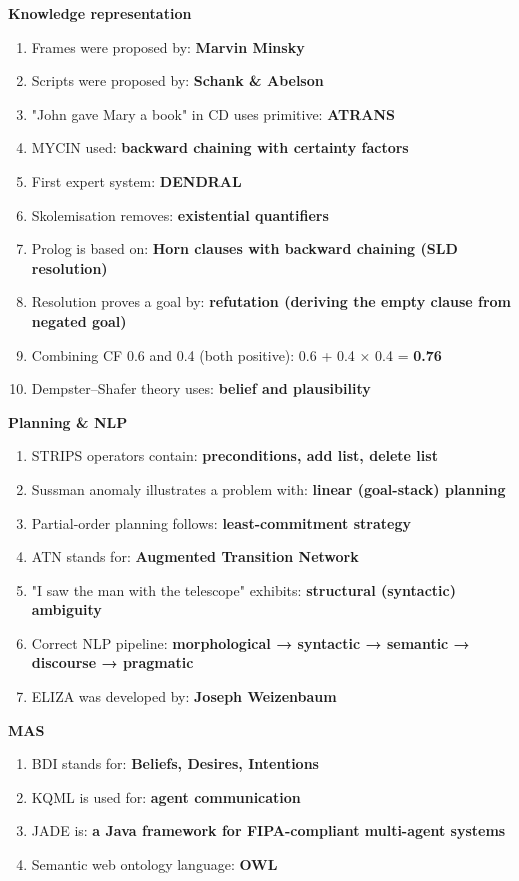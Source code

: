 \textbf{Knowledge representation}

\begin{enumerate}
\def\labelenumi{\arabic{enumi}.}
\setcounter{enumi}{19}
\tightlist
\item
  Frames were proposed by: \textbf{Marvin Minsky}
\item
  Scripts were proposed by: \textbf{Schank \& Abelson}
\item
  "John gave Mary a book" in CD uses primitive: \textbf{ATRANS}
\item
  MYCIN used: \textbf{backward chaining with certainty factors}
\item
  First expert system: \textbf{DENDRAL}
\item
  Skolemisation removes: \textbf{existential quantifiers}
\item
  Prolog is based on: \textbf{Horn clauses with backward chaining (SLD resolution)}
\item
  Resolution proves a goal by: \textbf{refutation (deriving the empty clause from negated goal)}
\item
  Combining CF 0.6 and 0.4 (both positive): 0.6 + 0.4 × 0.4 = \textbf{0.76}
\item
  Dempster--Shafer theory uses: \textbf{belief and plausibility}
\end{enumerate}

\textbf{Planning \& NLP}

\begin{enumerate}
\def\labelenumi{\arabic{enumi}.}
\setcounter{enumi}{29}
\tightlist
\item
  STRIPS operators contain: \textbf{preconditions, add list, delete list}
\item
  Sussman anomaly illustrates a problem with: \textbf{linear (goal-stack) planning}
\item
  Partial-order planning follows: \textbf{least-commitment strategy}
\item
  ATN stands for: \textbf{Augmented Transition Network}
\item
  "I saw the man with the telescope" exhibits: \textbf{structural (syntactic) ambiguity}
\item
  Correct NLP pipeline: \textbf{morphological → syntactic → semantic → discourse → pragmatic}
\item
  ELIZA was developed by: \textbf{Joseph Weizenbaum}
\end{enumerate}

\textbf{MAS}

\begin{enumerate}
\def\labelenumi{\arabic{enumi}.}
\setcounter{enumi}{36}
\tightlist
\item
  BDI stands for: \textbf{Beliefs, Desires, Intentions}
\item
  KQML is used for: \textbf{agent communication}
\item
  JADE is: \textbf{a Java framework for FIPA-compliant multi-agent systems}
\item
  Semantic web ontology language: \textbf{OWL}
\end{enumerate}

